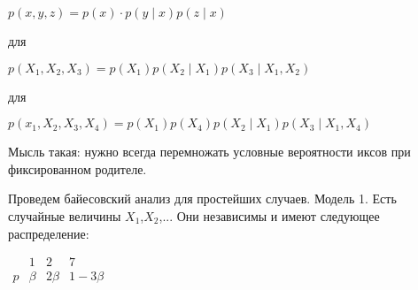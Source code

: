$p(x,y,z)=p(x)\cdot p(y \mid x) p(z \mid x)$

для

\begin{comment}
\begin{tikzpicture}
\tikzstyle{mycircle} = [circle, draw, minimum width=16pt, inner sep=0pt] %
\tikzset{edge from parent/.style=
     {-angle 45, %
     draw, edge from parent path={(\tikzparentnode) -- (\tikzchildnode)}}}
\tikzstyle{every node}=[mycircle]
\node  (1) {$X_1$} 
\node [below right of=1] (2) {$X_2$} 
\node [below left of=2] {$X_3$} (3)
\path
(1) edge node [left] (3)
	edge node [right] (2)
(2) edge node (3)
\end{tikzpicture}
\end{comment}



$p(X_1,X_2,X_3)=p(X_1)p(X_2\mid X_1) p(X_3 \mid X_1,X_2)$

для

\begin{comment}
 
\begin{tikzpicture}
\tikzstyle{mycircle} = [circle, draw, minimum width=16pt, inner sep=0pt] %
\tikzset{edge from parent/.style=
     {-angle 45, %
     draw, edge from parent path={(\tikzparentnode) -- (\tikzchildnode)}}}
\tikzstyle{every node}=[mycircle]
\node (1) {$X_1$} 
\node (2) [below of=1] {$X_2$} 
\node (3) [below of=2] {$X_3$}
\node (4) [left of=2]{$X_4$}
\path
(1) edge node (2)
(2) edge node (3)
(4) edge node (3)
\end{tikzpicture}

\end{comment}


$p(x_1,X_2,X_3,X_4)=p(X_1)p(X_4)p(X_2\mid X_1)p(X_3\mid X_1,X_4)$

Мысль такая: нужно всегда  перемножать условные вероятности иксов при фиксированном родителе.



Проведем байесовский анализ для простейших случаев.
Модель 1. Есть случайные величины $X_1$,$X_2$,...
Они независимы и имеют следующее распределение:

$\begin{array}{c|ccc}
    {} &  1  & 2  & 7   \\
\hline
    {p} &  {\beta} & {2\beta} & {1-3\beta}   \\
\end{array}$

